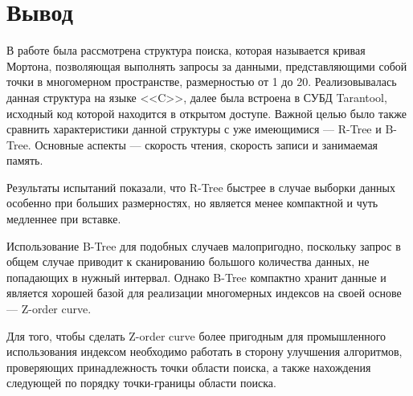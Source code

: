 \section{Вывод}
В работе была рассмотрена структура поиска, которая называется кривая Мортона,
позволяющая выполнять запросы за данными, представляющими собой точки в многомерном пространстве,
размерностью от 1 до 20.
Реализовывалась данная структура на языке <<C>>, далее была встроена в СУБД Tarantool,
исходный код которой находится в открытом доступе.
Важной целью было также сравнить характеристики данной структуры с уже имеющимися ---
R-Tree и B-Tree. Основные аспекты --- скорость чтения, скорость записи и занимаемая память.

Результаты испытаний показали, что R-Tree быстрее в случае выборки данных особенно
при больших размерностях,
но является менее компактной и чуть медленнее при вставке.

Использование B-Tree для подобных случаев малопригодно, поскольку
запрос в общем случае приводит к сканированию большого количества
данных, не попадающих в нужный интервал.
Однако B-Tree компактно хранит данные и является хорошей базой
для реализации многомерных индексов на своей основе --- Z-order curve.

Для того, чтобы сделать Z-order curve более пригодным для промышленного
использования индексом необходимо работать в сторону улучшения алгоритмов,
проверяющих принадлежность точки области поиска, а также нахождения следующей по порядку точки-границы области поиска.
